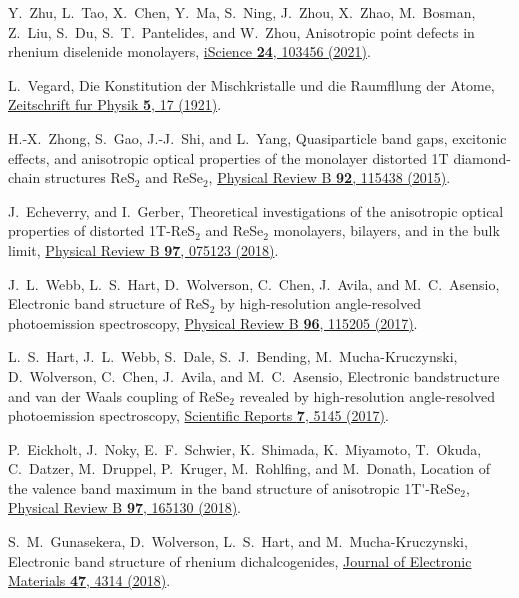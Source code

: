 \documentclass[reprint, superscriptaddress, amsmath,amssymb,prb,twocolumn]{revtex4-2}
\begin{document}
\begin{thebibliography}{116}
 Y.~Zhu, L.~Tao, X.~Chen, Y.~Ma, S.~Ning, J.~Zhou, X.~Zhao, M.~Bosman, Z.~Liu, S.~Du, S.~T.~Pantelides, and W.~Zhou, Anisotropic point defects in rhenium diselenide monolayers, \href{https://dx.doi.org/10.1016/j.isci.2021.103456}{iScience {\bf 24}, 103456 (2021)}. %

 L.~Vegard, Die Konstitution der Mischkristalle und die Raumfllung der Atome, \href{https://dx.doi.org/10.1007/BF01349680}{Zeitschrift fur Physik {\bf 5}, 17 (1921)}.

 H.-X.~Zhong, S.~Gao, J.-J.~Shi, and L.~Yang, Quasiparticle band gaps, excitonic effects, and anisotropic optical properties of the monolayer distorted 1T diamond-chain structures ReS$_{2}$ and ReSe$_{2}$, \href{https://dx.doi.org/10.1103/PhysRevB.92.115438}{Physical Review B {\bf 92}, 115438 (2015)}.

 J.~Echeverry, and I.~Gerber, Theoretical investigations of the anisotropic optical properties of distorted 1T-ReS$_{2}$ and ReSe$_{2}$ monolayers, bilayers, and in the bulk limit, \href{https://dx.doi.org/10.1103/PhysRevB.97.075123}{Physical Review B {\bf 97}, 075123 (2018)}.

 J.~L.~Webb, L.~S.~Hart, D.~Wolverson, C.~Chen, J.~Avila, and M.~C.~Asensio, Electronic band structure of ReS$_{2}$ by high-resolution angle-resolved photoemission spectroscopy, \href{https://dx.doi.org/10.1103/PhysRevB.96.115205}{Physical Review B {\bf 96}, 115205 (2017)}. %

 L.~S.~Hart, J.~L.~Webb, S.~Dale, S.~J.~Bending, M.~Mucha-Kruczynski, D.~Wolverson, C.~Chen, J.~Avila, and M.~C.~Asensio, Electronic bandstructure and van der Waals coupling of ReSe$_{2}$ revealed by high-resolution angle-resolved photoemission spectroscopy, \href{https://dx.doi.org/10.1038/s41598-017-05361-6}{Scientific Reports {\bf 7}, 5145 (2017)}. %

 P.~Eickholt, J.~Noky, E.~F.~Schwier, K.~Shimada, K.~Miyamoto, T.~Okuda, C.~Datzer, M.~Druppel, P.~Kruger, M.~Rohlfing, and M.~Donath, Location of the valence band maximum in the band structure of anisotropic 1T\'{}-ReSe$_{2}$, \href{https://dx.doi.org/10.1103/PhysRevB.97.165130}{Physical Review B {\bf 97}, 165130 (2018)}. %

 S.~M.~Gunasekera, D.~Wolverson, L.~S.~Hart, and M.~Mucha-Kruczynski, Electronic band structure of rhenium dichalcogenides, \href{https://dx.doi.org/10.1007/s11664-018-6239-0}{Journal of Electronic Materials {\bf 47}, 4314 (2018)}. %


\end{thebibliography}
\end{document}
